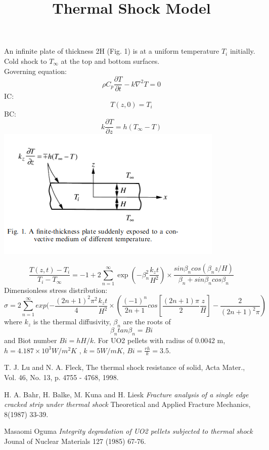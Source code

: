 \documentclass[12pt]{article}
\begin{document}
 
\title{Thermal Shock Model }
\maketitle
An infinite plate \cite{thermalShock_solid} of thickness 2H (Fig. 1) is at a uniform temperature $T_i$ initially.  Cold shock to $T_{\infty}$ at the top and bottom surfaces.  \\

Governing equation: 
\[\rho C_p \frac{\partial T}{\partial t} - k \nabla^2 T = 0 \]
IC:
\[T(z,0) = T_i\]
BC:
\[k\frac{\partial T}{\partial z} = h(T_{\infty} - T) \]
\includegraphics[]{fig1.png}

\[\frac{T(z,t) - T_i}{T_i - T_{\infty}} = -1 + 2 \sum ^{\infty} _{n=1} \exp(-\beta_n^2 \frac{k_z t}{H^2}) \times \frac{sin \beta_n cos(\beta_nz/H)}{\beta_n + sin \beta_n cos \beta_n} \]
Dimensionless stress distribution:
\[\sigma = 2 \sum ^{\infty} _{n=1} exp ( -\frac{(2n+1)^2\pi^2}{4} \frac{k_z t}{H^2} \times \left(\frac{(-1)^n}{2n+1} cos [\frac{(2n+1)\pi}{2} \frac{z}{H}] - \frac{2}{(2n+1)^2 \pi}\right) \]
where $k_z$ is the thermal diffusivity, $\beta_n$ are the roots of \[\beta_n tan \beta_n = Bi\]
and Biot number $Bi = hH/k$.  
For UO2 pellets with radius of 0.0042 m, $h = 4.187 \times 10^3 W/m^2K$ \cite{UO2_thermal_shock}, $k = 5 W/mK$,  $Bi = \frac{rh}{k} = 3.5$.

\begin{thebibliography}{9}
T. J. Lu and N. A. Fleck, The thermal shock resistance of solid, Acta Mater., Vol. 46, No. 13, p. 4755 - 4768, 1998.
 
H. A. Bahr, H. Balke, M. Kuna and H. Liesk
\textit{Fracture analysis of a single edge cracked strip under thermal shock}
Theoretical and Applied Fracture Mechanics, 8(1987) 33-39.
 
Masaomi Oguma
\textit{Integrity degradation of UO2 pellets subjected to thermal shock}
Jounal of Nuclear Materials 127 (1985) 67-76.
\end{thebibliography}
\end{document}
